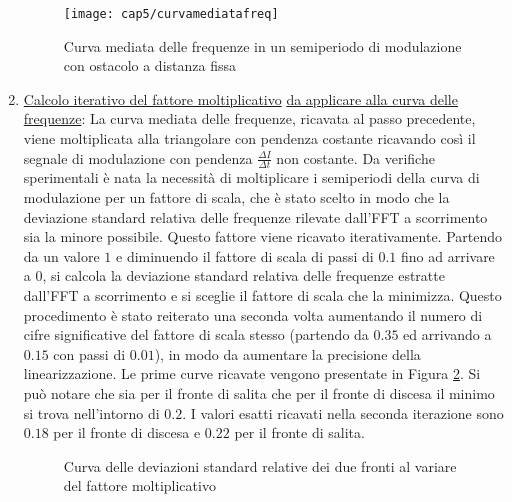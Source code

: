 \begin{enumerate}
		\begin{figure}[H]  
			\begin{center}
				\texttt{[image: cap5/curvamediatafreq]}
				\caption{Curva mediata delle frequenze in un semiperiodo di modulazione con ostacolo a distanza fissa}
				\label{curvamediatafreq}
			\end{center}
		\end{figure}
		
	
	\item \underline{Calcolo iterativo del fattore moltiplicativo} \underline{da applicare alla curva delle} \underline{frequenze}: La curva mediata delle frequenze, ricavata al passo precedente, viene moltiplicata alla triangolare con pendenza costante ricavando così il segnale di modulazione con pendenza $\frac{\Delta I}{\Delta t}$ non costante.
	Da verifiche sperimentali è nata la necessità di moltiplicare i semiperiodi della curva di modulazione per un fattore di scala, che è stato scelto in modo che la deviazione standard relativa delle frequenze rilevate dall'FFT a scorrimento sia la minore possibile.	
	Questo fattore viene ricavato iterativamente. Partendo da un valore $1$ e diminuendo il fattore di scala di passi di $0.1$ fino ad arrivare a $0$, si calcola la deviazione standard relativa delle frequenze estratte dall'FFT a scorrimento e si sceglie il fattore di scala che la minimizza.	
	Questo procedimento è stato reiterato una seconda volta aumentando il numero di cifre significative del fattore di scala stesso (partendo da $0.35$ ed arrivando a $0.15$ con passi di $0.01$), in modo da aumentare la precisione della linearizzazione.	
	Le prime curve ricavate vengono presentate in Figura \ref{mulfact}. Si può notare che sia per il fronte di salita che per il fronte di discesa il minimo si trova nell'intorno di $0.2$. I valori esatti ricavati nella seconda iterazione sono $0.18$ per il fronte di discesa e $0.22$ per il fronte di salita.
		\begin{figure}[H]
			\centering
		\end{figure}
		\begin{figure}[H]
			\centering
			\caption{Curva delle deviazioni standard relative dei due fronti al variare del fattore moltiplicativo}\label{mulfact}
		\end{figure}
	

\end{enumerate}
